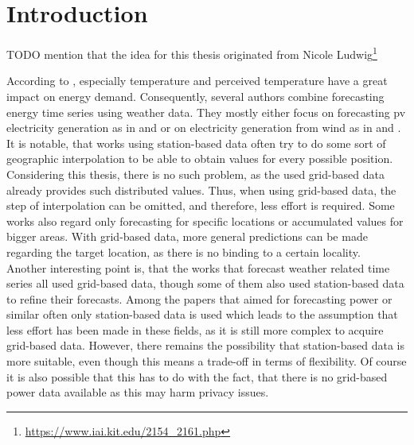 \chapter{Introduction}
\label{ch:Introduction}

TODO mention that the idea for this thesis originated from Nicole Ludwig\footnote{\url{https://www.iai.kit.edu/2154_2161.php}}

According to , especially temperature and perceived temperature have a great impact on energy demand. Consequently, several authors combine forecasting energy time series using weather data. They mostly either focus on forecasting \gls{pv} electricity generation as in  and  or on electricity generation from wind as in  and .\\

It is notable, that works using station-based data often try to do some sort of geographic interpolation to be able to obtain values for every possible position. Considering this thesis, there is no such problem, as the used grid-based data already provides such distributed values. Thus, when using grid-based data, the step of interpolation can be omitted, and therefore, less effort is required. Some works also regard only forecasting for specific locations or accumulated values for bigger areas. With grid-based data, more general predictions can be made regarding the target location, as there is no binding to a certain locality.\\

Another interesting point is, that the works that forecast weather related time series all used grid-based data, though some of them also used station-based data to refine their forecasts. Among the papers that aimed for forecasting power or similar often only station-based data is used which leads to the assumption that less effort has been made in these fields, as it is still more complex to acquire grid-based data. However, there remains the possibility that station-based data is more suitable, even though this means a trade-off in terms of flexibility. Of course it is also possible that this has to do with the fact, that there is no grid-based power data available as this may harm privacy issues.\\


